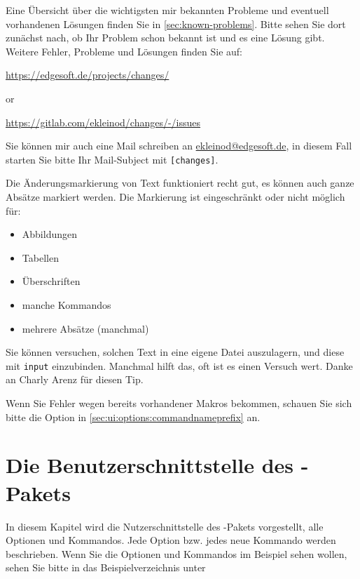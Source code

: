 Eine Übersicht über die wichtigsten mir bekannten Probleme und eventuell vorhandenen Lösungen finden Sie in \autoref{sec:known-problems}.
Bitte sehen Sie dort zunächst nach, ob Ihr Problem schon bekannt ist und es eine Lösung gibt.
Weitere Fehler, Probleme und Lösungen finden Sie auf:

\url{https://edgesoft.de/projects/changes/}

or

\url{https://gitlab.com/ekleinod/changes/-/issues}

Sie können mir auch eine Mail schreiben an \href{mailto:ekleinod@edgesoft.de}{ekleinod@edgesoft.de}, in diesem Fall starten Sie bitte Ihr Mail-Subject mit \texttt{[changes]}.

Die Änderungsmarkierung von Text funktioniert recht gut, es können auch ganze Absätze markiert werden.
Die Markierung ist eingeschränkt oder nicht möglich für:

\begin{itemize}
	\item Abbildungen
	\item Tabellen
	\item Überschriften
	\item manche Kommandos
	\item mehrere Absätze (manchmal)
\end{itemize}

Sie können versuchen, solchen Text in eine eigene Datei auszulagern, und diese mit \texttt{input} einzubinden.
Manchmal hilft das, oft ist es einen Versuch wert.
Danke an Charly Arenz für diesen Tip.

Wenn Sie Fehler wegen bereits vorhandener Makros bekommen, schauen Sie sich bitte die Option  in \autoref{sec:ui:options:commandnameprefix} an.


\cleardoublepage
\section{Die Benutzerschnittstelle des -Pakets}
\label{sec:ui}

In diesem Kapitel wird die Nutzerschnittstelle des -Pakets vorgestellt, \dh alle Optionen und Kommandos.
Jede Option bzw. jedes neue Kommando werden beschrieben.
Wenn Sie die Optionen und Kommandos im Beispiel sehen wollen, sehen Sie bitte in das Beispielverzeichnis unter


